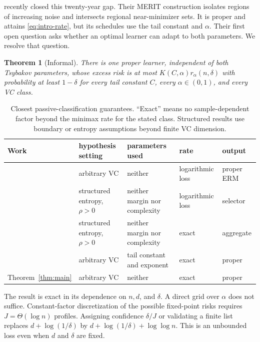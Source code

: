 \documentclass[twoside]{article}
\newtheorem{theorem}{Theorem}
\begin{document}
\citet{hanneke2026optimal} recently closed this twenty-year gap. Their MERIT construction isolates regions of increasing noise and intersects regional near-minimizer sets. It is proper and attains \eqref{eq:intro-rate}, but its schedules use the tail constant and $\alpha$. Their first open question asks whether an optimal learner can adapt to both parameters. We resolve that question.

\begin{theorem}[Informal]
There is one proper learner, independent of both Tsybakov parameters, whose excess risk is at most $K(C,\alpha)r_\alpha(n,\delta)$ with probability at least $1-\delta$ for every tail constant $C$, every $\alpha\in(0,1)$, and every VC class.
\end{theorem}

\begin{table}[t]
\caption{Closest passive-classification guarantees. ``Exact'' means no sample-dependent factor beyond the minimax rate for the stated class. Structured results use boundary or entropy assumptions beyond finite VC dimension.}
\label{tab:comparison}
\centering
\footnotesize
\begin{tabularx}{\textwidth}{@{}lXXll@{}}
\toprule
Work & hypothesis setting & parameters used & rate & output \\
\midrule
\citet{massart2006risk} & arbitrary VC & neither & logarithmic loss & proper ERM \\
\citet{tsybakov2004optimal} & structured entropy, $\rho>0$ & neither margin nor complexity & logarithmic loss & selector \\
\citet{lecue2007simultaneous} & structured entropy, $\rho>0$ & neither margin nor complexity & exact & aggregate \\
\citet{hanneke2026optimal} & arbitrary VC & tail constant and exponent & exact & proper \\
Theorem~\ref{thm:main} & arbitrary VC & neither & exact & proper \\
\bottomrule
\end{tabularx}
\end{table}

The result is exact in its dependence on $n,d$, and $\delta$. A direct grid over $\alpha$ does not suffice. Constant-factor discretization of the possible fixed-point risks requires $J=\Theta(\!\log n)$ profiles. Assigning confidence $\delta/J$ or validating a finite list replaces $d+\log(1/\delta)$ by $d+\log(1/\delta)+\log\log n$. This is an unbounded loss even when $d$ and $\delta$ are fixed.
\end{document}
